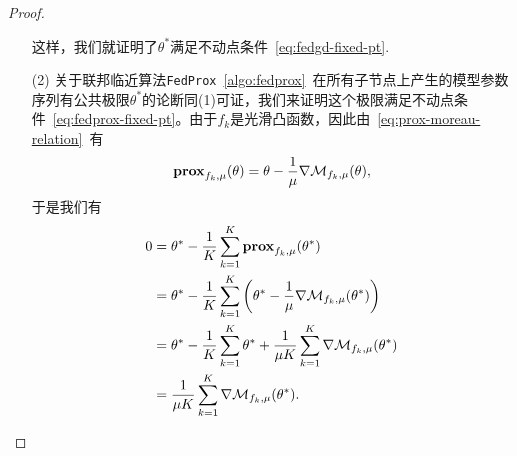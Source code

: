 \begin{proof}
\begin{itemize}
这样，我们就证明了$\theta^*$满足不动点条件~\eqref{eq:fedgd-fixed-pt}.
\item[(2)] 关于联邦临近算法\texttt{FedProx}~\ref{algo:fedprox}~在所有子节点上产生的模型参数序列有公共极限$\theta^*$的论断同(1)可证，我们来证明这个极限满足不动点条件~\eqref{eq:fedprox-fixed-pt}。由于$f_k$是光滑凸函数，因此由~\eqref{eq:prox-moreau-relation}~有
\begin{equation*}
\mathbf{prox}_{f_k, \mu} (\theta) = \theta - \frac{1}{\mu} \nabla \mathcal{M}_{f_k, \mu}(\theta),
\end{equation*}
于是我们有
\begin{align*}
0 & = \theta^* - \frac{1}{K}\sum_{k=1}^K \mathbf{prox}_{f_k, \mu}(\theta^*) \\
& = \theta^* - \frac{1}{K} \sum_{k=1}^K \left( \theta^* - \frac{1}{\mu} \nabla \mathcal{M}_{f_k, \mu}(\theta^*) \right) \\
& = \theta^* - \frac{1}{K} \sum_{k=1}^K \theta^* + \frac{1}{\mu K} \sum_{k=1}^K \nabla \mathcal{M}_{f_k, \mu}(\theta^*) \\
& = \frac{1}{\mu K} \sum_{k=1}^K \nabla \mathcal{M}_{f_k, \mu}(\theta^*).
\end{align*}
\end{itemize}
\end{proof}

